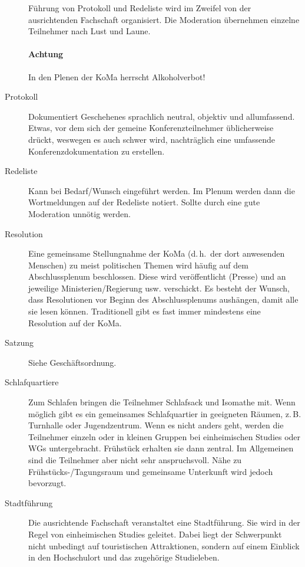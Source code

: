 \begin{description}
	Führung von Protokoll und Redeliste wird im Zweifel von der ausrichtenden
	Fachschaft organisiert. Die Moderation übernehmen einzelne Teilnehmer nach
	Lust und Laune.

	\paragraph{Achtung} In den Plenen der KoMa herrscht Alkoholverbot!

\item[Protokoll] Dokumentiert Geschehenes sprachlich neutral, objektiv und
	allumfassend. Etwas, vor dem sich der gemeine Konferenzteilnehmer
	üblicherweise drückt, weswegen es auch schwer wird, nachträglich eine
	umfassende Konferenzdokumentation zu erstellen.

\item[Redeliste] Kann bei Bedarf/Wunsch eingeführt werden. Im Plenum werden
	dann die Wortmeldungen auf der Redeliste notiert. Sollte durch eine gute
	Moderation unnötig werden.

\item[Resolution] Eine gemeinsame Stellungnahme der KoMa (d.\,h.\ der dort
	anwesenden Menschen) zu meist politischen Themen wird häufig auf dem
	Abschlussplenum beschlossen.  Diese wird veröffentlicht (Presse) und an
	jeweilige Ministerien/Regierung usw. verschickt. Es besteht der Wunsch,
	dass Resolutionen vor Beginn des Abschlussplenums aushängen, damit alle sie
	lesen können. Traditionell gibt es fast immer mindestens eine Resolution
	auf der KoMa.

\item[Satzung] Siehe Geschäftsordnung.

\item[Schlafquartiere] Zum Schlafen bringen die Teilnehmer Schlafsack und
	Isomathe mit. Wenn möglich gibt es ein gemeinsames Schlafquartier in
	geeigneten Räumen, z.\,B. Turnhalle oder Jugendzentrum. Wenn es nicht
	anders geht, werden die Teilnehmer einzeln oder in kleinen Gruppen bei
	einheimischen Studies oder WGs untergebracht. Frühstück erhalten sie dann
	zentral. Im Allgemeinen sind die Teilnehmer aber nicht sehr anspruchsvoll.
	Nähe zu Frühstücks-/Tagungsraum und gemeinsame Unterkunft wird jedoch
	bevorzugt.

\item[Stadtführung] Die ausrichtende Fachschaft veranstaltet eine Stadtführung.
	Sie wird in der Regel von einheimischen Studies geleitet. Dabei liegt der
	Schwerpunkt nicht unbedingt auf touristischen Attraktionen, sondern auf
	einem Einblick in den Hochschulort und das zugehörige Studieleben.


\end{description}
